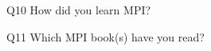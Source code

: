 \begin{description}%
\item{Q10} How did you learn MPI?%
\item{Q11} Which MPI book(s) have you read?%
\end{description}%
